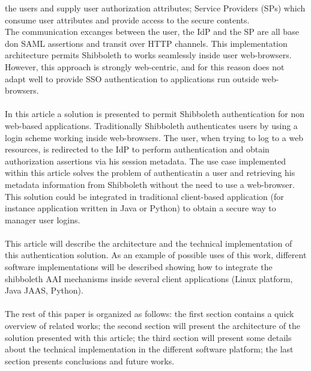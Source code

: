 the users and supply user authorization attributes; Service Providers (SPs) which consume user attributes and provide access to the secure
contents.\\
The communication excanges between the user, the IdP and the SP are all base don SAML assertions and transit over HTTP channels.
This implementation architecture permits Shibboleth to works seamlessly inside user web-browsers.
However, this approach is strongly web-centric, and for this reason does not adapt well to provide SSO authentication to applications
run outside web-browsers.\\
\\
In this article a solution is presented to permit Shibboleth authentication for non web-based applications.
Traditionally Shibboleth authenticates users by using a login scheme working inside web-browsers.
The user, when trying to log to a web resources, is redirected to the IdP to perform authentication and obtain authorization assertions via
his session metadata.
The use case implemented within this article solves the problem of authenticatin a user and retrieving his metadata information from Shibboleth
without the need to use a web-browser.
This solution could be integrated in traditional client-based application (for instance application written in Java or Python) to obtain
a secure way to manager user logins.\\
\\
This article will describe the architecture and the technical implementation of this authentication solution.
As an example of possible uses of this work, different software implementations will be described showing how to integrate the shibboleth AAI
mechanisms inside several client applications (Linux platform, Java JAAS, Python).\\
\\
The rest of this paper is organized as follows: the first section contains a quick overview of related works; the second section will present
the architecture of the solution presented with this article; the third section will present some details about the technical implementation
in the different software platform; the last section presents conclusions and future works.

\label{sec:relatedworks}
